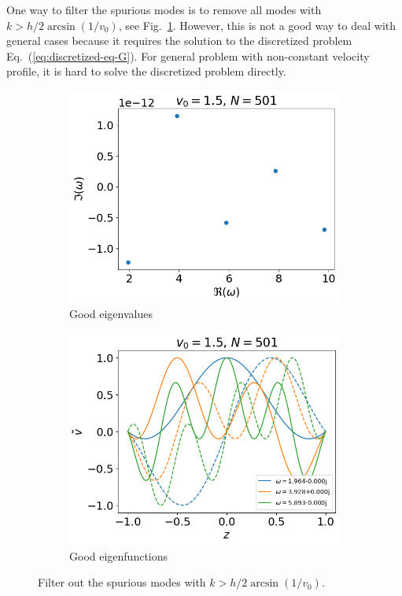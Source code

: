 One way to filter the spurious modes is to remove all modes with $k>h/2 \arcsin(1/v_0)$, see Fig.~\ref{fig:results-filter-k}. However, this is not a good way to deal with general cases because it requires the solution to the discretized problem Eq.~(\ref{eq:discretized-eq-G}). For general problem with non-constant velocity profile, it is hard to solve the discretized problem directly.

\begin{figure}[H]
	\centering
	\begin{subfigure}[b]{0.5\linewidth}
		\includegraphics[width=\linewidth]{figures/eigvals-good}
		\caption{Good eigenvalues}
	\end{subfigure}%
	\begin{subfigure}[b]{0.5\linewidth}
		\includegraphics[width=\linewidth]{figures/eigvecs-good}
		\caption{Good eigenfunctions}
	\end{subfigure}
	\caption{Filter out the spurious modes with $k>h/2\arcsin(1/v_0)$.}
	\label{fig:results-filter-k}
\end{figure}


